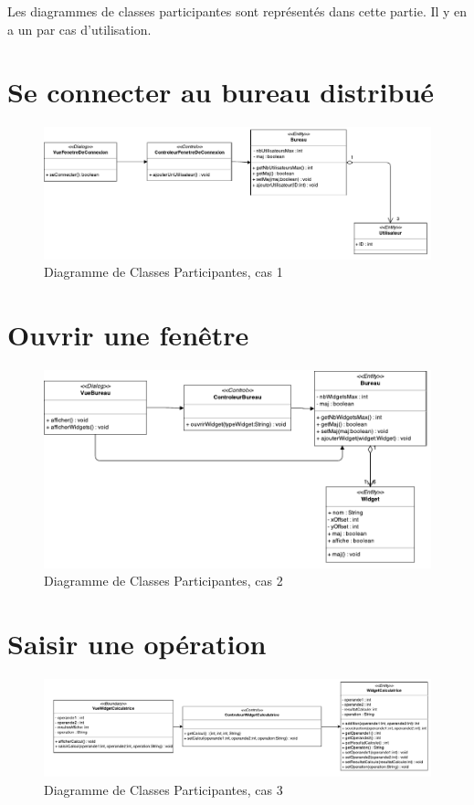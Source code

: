 Les diagrammes de classes participantes sont représentés dans cette 
partie. Il y en a un par cas d'utilisation.

\section{Se connecter au bureau distribué}

\noindent\begin{figure}[H]
	\centering
	\includegraphics[angle=90,scale=0.8]{diagrammes/DCP1.pdf}
	\caption{Diagramme de Classes Participantes, cas 1}
\end{figure}

\section{Ouvrir une fenêtre}

\begin{figure}[H]
	\centering
	\includegraphics[angle=90]{diagrammes/DCP2.pdf}
	\caption{Diagramme de Classes Participantes, cas 2}
\end{figure}

\section{Saisir une opération}
\noindent\begin{figure}[H]
	\centering
	\includegraphics[angle=90,scale=0.9]{diagrammes/DCP3.pdf}
	\caption{Diagramme de Classes Participantes, cas 3}
\end{figure}

